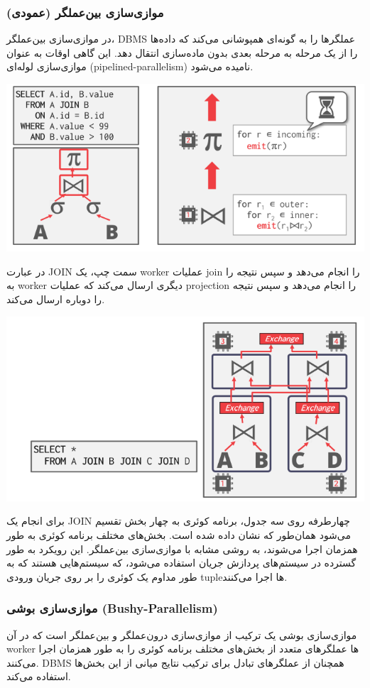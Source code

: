 \subsubsection{موازی‌سازی بین‌عملگر (عمودی)}
در موازی‌سازی بین‌عملگر، DBMS عملگرها را به گونه‌ای همپوشانی می‌کند که داده‌ها را از یک مرحله به مرحله بعدی بدون ماده‌سازی انتقال دهد. این گاهی اوقات به عنوان موازی‌سازی لوله‌ای (pipelined-parallelism) نامیده می‌شود.

\qquad\qquad\qquad	\includegraphics[width=0.7\linewidth]{screenshot014}


در عبارت JOIN سمت چپ، یک worker عملیات join را انجام می‌دهد و سپس نتیجه را به worker دیگری ارسال می‌کند که عملیات projection را انجام می‌دهد و سپس نتیجه را دوباره ارسال می‌کند.

\qquad\qquad\qquad	\includegraphics[width=0.7\linewidth]{screenshot015}

برای انجام یک JOIN چهارطرفه روی سه جدول، برنامه کوئری به چهار بخش تقسیم می‌شود همان‌طور که نشان داده شده است. بخش‌های مختلف برنامه کوئری به طور همزمان اجرا می‌شوند، به روشی مشابه با موازی‌سازی بین‌عملگر.
این رویکرد به طور گسترده در سیستم‌های پردازش جریان استفاده می‌شود، که سیستم‌هایی هستند که به طور مداوم یک کوئری را بر روی جریان ورودی tupleها اجرا می‌کنند.

\subsubsection{موازی‌سازی بوشی (Bushy-Parallelism)}
موازی‌سازی بوشی یک ترکیب از موازی‌سازی درون‌عملگر و بین‌عملگر است که در آن worker ها عملگرهای متعدد از بخش‌های مختلف برنامه کوئری را به طور همزمان اجرا می‌کنند.
DBMS همچنان از عملگرهای تبادل برای ترکیب نتایج میانی از این بخش‌ها استفاده می‌کند.


